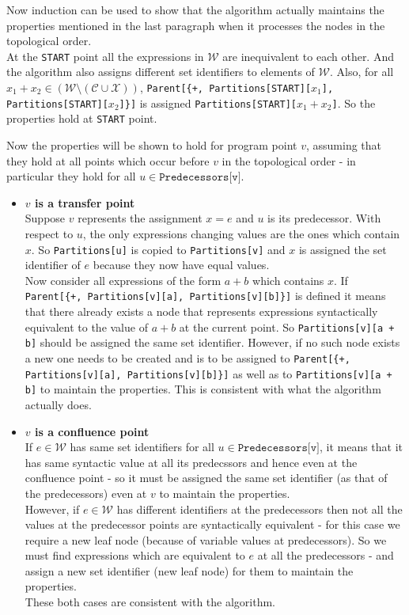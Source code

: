 Now induction can be used to show that the algorithm actually maintains the properties mentioned in the last paragraph when it processes the nodes in the topological order.
\\
At the \texttt{START} point all the expressions in $\mathcal{W}$ are inequivalent to each other. And the algorithm also assigns different set identifiers to elements of $\mathcal{W}$. Also, for all $x_1 + x_2 \in (\mathcal{W} \setminus (\mathcal{C} \cup \mathcal{X}))$, \texttt{Parent[\{+, Partitions[START][$x_1$], Partitions[START][$x_2$]\}]} is assigned \texttt{Partitions[START][$x_1 + x_2$]}. So the properties hold at \texttt{START} point.

Now the properties will be shown to hold for program point $v$, assuming that they hold at all points which occur before $v$ in the topological order - in particular they hold for all $u \in \texttt{Predecessors[v]}$.
\begin{itemize}
    \item \textbf{$v$ is a transfer point}\\
    Suppose $v$ represents the assignment $x = e$ and $u$ is its predecessor. With respect to $u$, the only expressions changing values are the ones which contain $x$. So \texttt{Partitions[u]} is copied to \texttt{Partitions[v]} and $x$ is assigned the set identifier of $e$ because they now have equal values.\\
    Now consider all expressions of the form $a + b$ which contains $x$. If \texttt{Parent[\{+, Partitions[v][a], Partitions[v][b]\}]} is defined it means that there already exists a node that represents expressions syntactically equivalent to the value of $a + b$ at the current point. So \texttt{Partitions[v][a + b]} should be assigned the same set identifier. However, if no such node exists a new one needs to be created and is to be assigned to \texttt{Parent[\{+, Partitions[v][a], Partitions[v][b]\}]} as well as to \texttt{Partitions[v][a + b]} to maintain the properties. This is consistent with what the algorithm actually does.

    \item \textbf{$v$ is a confluence point}\\
    If $e \in \mathcal{W}$ has same set identifiers for all $u \in \texttt{Predecessors[v]}$, it means that it has same syntactic value at all its predecssors and hence even at the confluence point - so it must be assigned the same set identifier (as that of the predecessors) even at $v$ to maintain the properties.\\
    However, if $e \in \mathcal{W}$ has different identifiers at the predecessors then not all the values at the predecessor points are syntactically equivalent - for this case we require a new leaf node (because of variable values at predecessors). So we must find expressions which are equivalent to $e$ at all the predecessors - and assign a new set identifier (new leaf node) for them to maintain the properties.\\
    These both cases are consistent with the algorithm.
\end{itemize}
